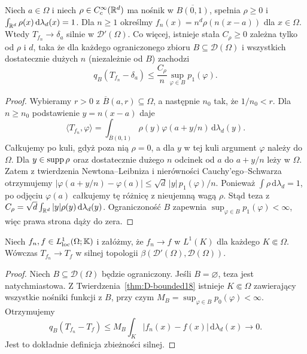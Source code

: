 \begin{twierdzenie}
\label{thm:mollifier-delta19}
Niech $a\in\Omega$ i niech
$\rho\in C_c^\infty(\mathbb R^d)$ ma nośnik w
$\overline{B(0,1)}$, spełnia $\rho\ge0$ i
$\int_{\mathbb R^d}\rho(x)\,\mathrm d\lambda_d(x)=1$.
Dla $n\ge1$ określmy
$f_n(x)=n^d\rho(n(x-a))$ dla $x\in\Omega$.
Wtedy $T_{f_n}\to\delta_a$ silnie w $\mathcal D'(\Omega)$.
Co więcej, istnieje stała $C_\rho\ge0$ zależna tylko od
$\rho$ i $d$, taka że dla każdego ograniczonego zbioru
$B\subseteq\mathcal D(\Omega)$ i wszystkich dostatecznie
dużych $n$ (niezależnie od $B$) zachodzi
\[q_B(T_{f_n}-\delta_a)\le
\frac{C_\rho}{n}\sup_{\varphi\in B}p_1(\varphi).\]
\end{twierdzenie}
\begin{proof}
Wybieramy $r>0$ z $\overline B(a,r)\subseteq\Omega$,
a następnie $n_0$ tak, że $1/n_0<r$.
Dla $n\ge n_0$ podstawienie $y=n(x-a)$ daje
\[\langle T_{f_n},\varphi\rangle
=\int_{\overline B(0,1)}\rho(y)\varphi(a+y/n)\,
\mathrm d\lambda_d(y).\]
Całkujemy po kuli, gdyż poza nią $\rho=0$,
a dla $y$ w tej kuli argument $\varphi$ należy do $\Omega$.
Dla $y\in\operatorname{supp}\rho$ oraz dostatecznie dużego $n$
odcinek od $a$ do $a+y/n$ leży w $\Omega$. Zatem
z twierdzenia Newtona--Leibniza i nierówności Cauchy'ego--Schwarza
otrzymujemy
$|\varphi(a+y/n)-\varphi(a)|\le
\sqrt d\,|y|\,p_1(\varphi)/n$.
Ponieważ $\int\rho\,\mathrm d\lambda_d=1$,
po odjęciu $\varphi(a)$ całkujemy tę różnicę
z nieujemną wagą $\rho$.
Stąd teza z
$C_\rho=\sqrt d\int_{\mathbb R^d}|y|\rho(y)\,
\mathrm d\lambda_d(y)$. Ograniczoność $B$ zapewnia
$\sup_{\varphi\in B}p_1(\varphi)<\infty$, więc prawa
strona dąży do zera.
\end{proof}



\begin{twierdzenie}
\label{thm:L1-to-strong19}
Niech $f_n,f\in L^1_{\mathrm{loc}}(\Omega;\mathbb K)$ i załóżmy,
że $f_n\to f$ w $L^1(K)$ dla każdego $K\Subset\Omega$.
Wówczas $T_{f_n}\to T_f$ w silnej topologii
$\beta(\mathcal D'(\Omega),\mathcal D(\Omega))$.
\end{twierdzenie}
\begin{proof}
Niech $B\subseteq\mathcal D(\Omega)$ będzie ograniczony.
Jeśli $B=\varnothing$, teza jest natychmiastowa.
Z Twierdzenia~\ref{thm:D-bounded18} istnieje
$K\Subset\Omega$ zawierający wszystkie nośniki funkcji
z $B$, przy czym $M_B=\sup_{\varphi\in B}p_0(\varphi)<\infty$.
Otrzymujemy
\[q_B(T_{f_n}-T_f)\le
M_B\int_K|f_n(x)-f(x)|\,\mathrm d\lambda_d(x)
\longrightarrow0.\]
Jest to dokładnie definicja zbieżności silnej.
\end{proof}

